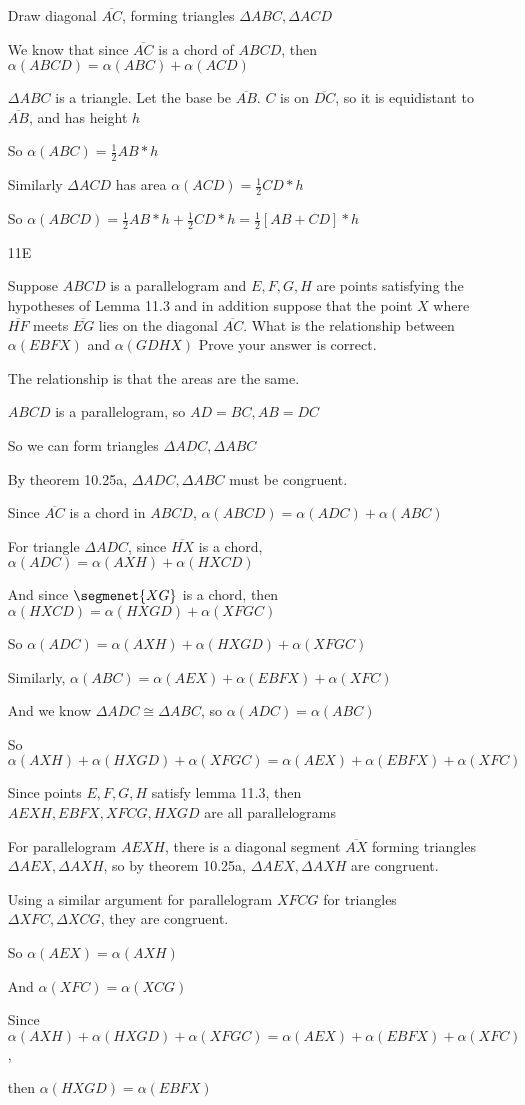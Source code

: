 \documentclass[11pt]{article}
\newcommand{\segment}[1]{\overline{#1}}
\begin{document}
\begin{itemize}
		Draw diagonal $\segment{AC}$, forming triangles $\Delta ABC, \Delta ACD$

		We know that since $\segment{AC}$ is a chord of $ABCD$, then $\alpha(ABCD) = \alpha(ABC) + \alpha(ACD)$

		$\Delta ABC$ is a triangle. Let the base be $\segment{AB}$. $C$ is on $\segment{DC}$, so it is equidistant to $\segment{AB}$, and has height $h$

		So $\alpha(ABC) = \frac{1}{2}AB*h$

		Similarly $\Delta ACD$ has area $\alpha(ACD) = \frac{1}{2}CD*h$

		So $\alpha(ABCD) = \frac{1}{2}AB*h + \frac{1}{2}CD*h = \frac{1}{2}[AB + CD]*h$

	\item[11E]

		Suppose $ABCD$ is a parallelogram and $E,F,G,H$ are points satisfying the hypotheses of Lemma 11.3 and in addition suppose that the point $X$ where $\segment{HF}$ meets $\segment{EG}$ lies on the diagonal $\segment{AC}$. What is the relationship between $\alpha(EBFX)$ and $\alpha(GDHX)$ Prove your answer is correct.

		The relationship is that the areas are the same.

		$ABCD$ is a parallelogram, so $AD = BC, AB = DC$

		So we can form triangles $\Delta ADC, \Delta ABC$

		By theorem 10.25a, $\Delta ADC, \Delta ABC$ must be congruent.

		Since $\segment{AC}$ is a chord in $ABCD$, $\alpha(ABCD) = \alpha(ADC) + \alpha(ABC)$

		For triangle $\Delta ADC$, since $\segment{HX}$ is a chord, $\alpha(ADC) = \alpha(AXH) + \alpha(HXCD)$

		And since $\segmenet{XG}$ is a chord, then $\alpha(HXCD) = \alpha(HXGD) + \alpha(XFGC)$

		So $\alpha(ADC) = \alpha(AXH) + \alpha(HXGD) + \alpha(XFGC)$

		Similarly, $\alpha(ABC) = \alpha(AEX) + \alpha(EBFX) + \alpha(XFC)$

		And we know $\Delta ADC \cong \Delta ABC$, so $\alpha(ADC) = \alpha(ABC)$

		So $\alpha(AXH) + \alpha(HXGD) + \alpha(XFGC) = \alpha(AEX) + \alpha(EBFX) + \alpha(XFC)$

		Since points $E,F,G,H$ satisfy lemma 11.3, then $AEXH, EBFX, XFCG, HXGD$ are all parallelograms

		For parallelogram $AEXH$, there is a diagonal segment $\segment{AX}$ forming triangles $\Delta AEX, \Delta AXH$, so by theorem 10.25a, $\Delta AEX, \Delta AXH$ are congruent.

		Using a similar argument for parallelogram $XFCG$ for triangles $\Delta XFC, \Delta XCG$, they are congruent.

		So $\alpha(AEX) = \alpha(AXH)$

		And $\alpha(XFC) = \alpha(XCG)$

		Since $\alpha(AXH) + \alpha(HXGD) + \alpha(XFGC) = \alpha(AEX) + \alpha(EBFX) + \alpha(XFC)$,

		then $\alpha(HXGD) = \alpha(EBFX)$
\end{itemize}
\end{document}
